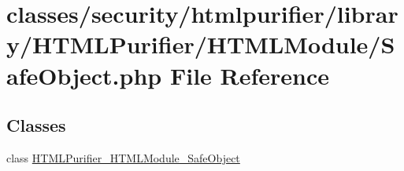 \hypertarget{HTMLModule_2SafeObject_8php}{\section{classes/security/htmlpurifier/library/\+H\+T\+M\+L\+Purifier/\+H\+T\+M\+L\+Module/\+Safe\+Object.php File Reference}
\label{HTMLModule_2SafeObject_8php}
}
\subsection*{Classes}
\begin{DoxyCompactItemize}
\item 
class \hyperlink{classHTMLPurifier__HTMLModule__SafeObject}{H\+T\+M\+L\+Purifier\+\_\+\+H\+T\+M\+L\+Module\+\_\+\+Safe\+Object}
\end{DoxyCompactItemize}
